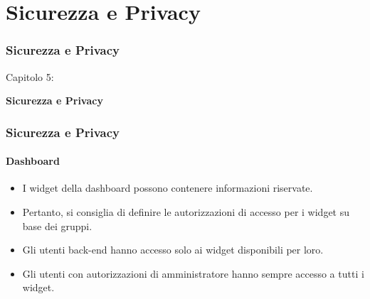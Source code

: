 %

\section{Sicurezza e Privacy}
\begin{frame}[fragile]
	\frametitle{Sicurezza e Privacy}

	\begin{center}\huge{Capitolo 5:}\end{center}
	\begin{center}\huge{\color{typo3darkgrey}\textbf{Sicurezza e Privacy}}\end{center}

\end{frame}


\begin{frame}[fragile]
	\frametitle{Sicurezza e Privacy}
	\framesubtitle{Dashboard}

	\begin{itemize}
		\item I widget della dashboard possono contenere informazioni riservate.
		\item Pertanto, si consiglia di definire le autorizzazioni di accesso per i widget su base dei gruppi.
		\item Gli utenti back-end hanno accesso solo ai widget disponibili per loro.
		\item Gli utenti con autorizzazioni di amministratore hanno sempre accesso a tutti i widget.
	\end{itemize}

\end{frame}



